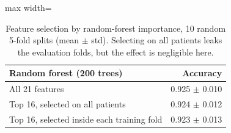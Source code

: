 \begin{table}[H]
\centering
\small
\setlength{\tabcolsep}{4pt}
\begin{adjustbox}{max width=\linewidth}
\begin{tabular}{lr}
\toprule
Random forest (200 trees) & Accuracy \\
\midrule
All 21 features & 0.925 $\pm$ 0.010 \\
Top 16, selected on all patients & 0.924 $\pm$ 0.012 \\
Top 16, selected inside each training fold & 0.923 $\pm$ 0.013 \\
\bottomrule
\end{tabular}
\end{adjustbox}
\caption{Feature selection by random-forest importance, 10 random 5-fold splits (mean $\pm$ std). Selecting on all patients leaks the evaluation folds, but the effect is negligible here.}
\label{tab:supp-selection}
\end{table}
